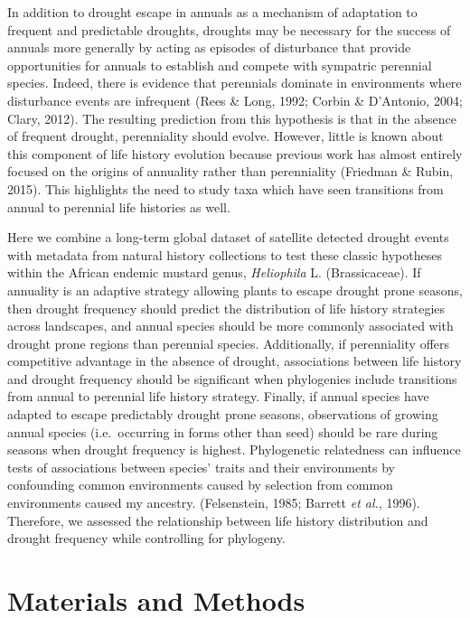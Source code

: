 \documentclass[man,floatsintext]{apa6}
\theoremstyle{definition}
\theoremstyle{definition}
\theoremstyle{definition}
\theoremstyle{remark}
\begin{document}
In addition to drought escape in annuals as a mechanism of adaptation to
frequent and predictable droughts, droughts may be necessary for the
success of annuals more generally by acting as episodes of disturbance
that provide opportunities for annuals to establish and compete with
sympatric perennial species. Indeed, there is evidence that perennials
dominate in environments where disturbance events are infrequent (Rees
\& Long, 1992; Corbin \& D'Antonio, 2004; Clary, 2012). The resulting
prediction from this hypothesis is that in the absence of frequent
drought, perenniality should evolve. However, little is known about this
component of life history evolution because previous work has almost
entirely focused on the origins of annuality rather than perenniality
(Friedman \& Rubin, 2015). This highlights the need to study taxa which
have seen transitions from annual to perennial life histories as well.

Here we combine a long-term global dataset of satellite detected drought
events with metadata from natural history collections to test these
classic hypotheses within the African endemic mustard genus,
\emph{Heliophila} L. (Brassicaceae). If annuality is an adaptive
strategy allowing plants to escape drought prone seasons, then drought
frequency should predict the distribution of life history strategies
across landscapes, and annual species should be more commonly associated
with drought prone regions than perennial species. Additionally, if
perenniality offers competitive advantage in the absence of drought,
associations between life history and drought frequency should be
significant when phylogenies include transitions from annual to
perennial life history strategy. Finally, if annual species have adapted
to escape predictably drought prone seasons, observations of growing
annual species (i.e.~occurring in forms other than seed) should be rare
during seasons when drought frequency is highest. Phylogenetic
relatedness can influence tests of associations between species' traits
and their environments by confounding common environments caused by
selection from common environments caused my ancestry. (Felsenstein,
1985; Barrett \emph{et al.}, 1996). Therefore, we assessed the
relationship between life history distribution and drought frequency
while controlling for phylogeny.

\hypertarget{materials-and-methods}{%
\section{Materials and Methods}\label{materials-and-methods}}
\end{document}
